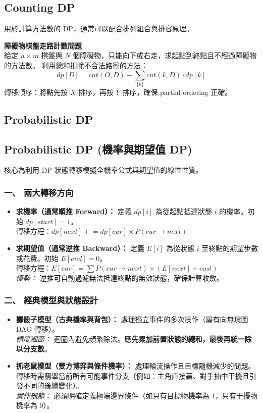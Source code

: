 \documentclass[a4paper,10pt,twocolumn,oneside]{article}
\begin{document}
\subsection{Counting DP}
用於計算方法數的 DP，通常可以配合排列組合與排容原理。

\textbf{障礙物棋盤走路計數問題} \\
給定 $n \times m$ 棋盤與 $N$ 個障礙物，只能向下或右走，求起點到終點且不經過障礙物的方法數。
利用總和扣除不合法路徑的方法：
$$dp[D] = cnt(O,D) - \sum_{\{k\}} cnt(k,D) \cdot dp[k]$$
轉移順序：將點先按 $X$ 排序，再按 $Y$ 排序，確保 partial-ordering 正確。


\subsection{Probabilistic DP}
\subsection{Probabilistic DP (機率與期望值 DP)}
核心為利用 DP 狀態轉移模擬全機率公式與期望值的線性性質。

\subsubsection*{一、 兩大轉移方向}
\begin{itemize}
    \item \textbf{求機率（通常順推 Forward）：} 
    定義 $dp[i]$ 為從起點抵達狀態 $i$ 的機率。初始 $dp[start] = 1$。\\
    轉移方程：$dp[next] \mathrel{+}= dp[cur] \times P(cur \to next)$
    \item \textbf{求期望值（通常逆推 Backward）：} 
    定義 $E[i]$ 為從狀態 $i$ 至終點的期望步數或花費。初始 $E[end] = 0$。\\
    轉移方程：$E[cur] = \sum P(cur \to next) \times (E[next] + cost)$\\
    \textit{優勢：} 逆推可自動過濾無法抵達終點的無效狀態，確保計算收斂。
\end{itemize}

\subsubsection*{二、 經典模型與狀態設計}
\begin{itemize}
    \item \textbf{擲骰子模型（古典機率與背包）：} 
    處理獨立事件的多次操作（屬有向無環圖 DAG 轉移）。\\
    \textit{精度細節：} 迴圈內避免頻繁除法。應\textbf{先累加前置狀態的總和，最後再統一除以分支數}。
    \item \textbf{抓老鼠模型（雙方博弈與條件機率）：} 
    處理輪流操作且目標隨機減少的問題。轉移時需窮舉當前所有可能事件分支（例如：主角直接贏、對手抽中干擾且引發不同的後續變化）。\\
    \textit{實作細節：} 必須明確定義極端邊界條件（如只有目標物機率為 $1$，只有干擾物機率為 $0$）。
\end{itemize}
\end{document}
